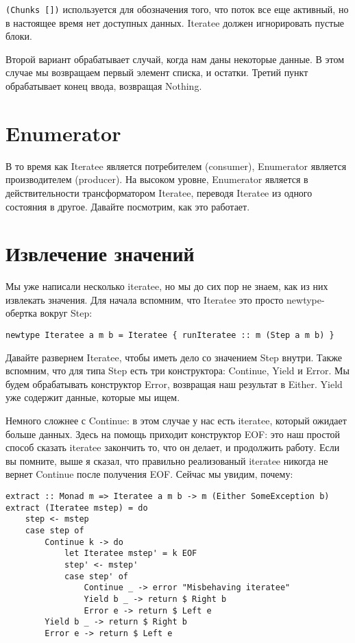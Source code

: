 \lstinline'(Chunks [])' используется для обозначения того, что поток все еще активный, но в настоящее время нет доступных данных. Iteratee должен игнорировать пустые блоки.

Второй вариант обрабатывает случай, когда нам даны некоторые данные. В этом случае мы возвращаем первый элемент списка, и остатки. Третий пункт обрабатывает конец ввода, возвращая Nothing.

\section{Enumerator}

В то время как Iteratee является потребителем (consumer), Enumerator является производителем (producer). На высоком уровне, Enumerator является в действительности трансформатором Iteratee, переводя Iteratee из одного состояния в другое. Давайте посмотрим, как это работает.

\section{Извлечение значений}

Мы уже написали несколько iteratee, но мы до сих пор не знаем, как из них извлекать значения. Для начала вспомним, что Iteratee это просто newtype-обертка вокруг Step:

\begin{lstlisting}
newtype Iteratee a m b = Iteratee { runIteratee :: m (Step a m b) }
\end{lstlisting}

Давайте развернем Iteratee, чтобы иметь дело со значением Step внутри. Также вспомним, что для типа Step есть три конструктора: Continue, Yield и Error. Мы будем обрабатывать конструктор Error, возвращая наш результат в Either. Yield уже содержит данные, которые мы ищем.

Немного сложнее с Continue: в этом случае у нас есть iteratee, который ожидает больше данных. Здесь на помощь приходит конструктор EOF: это наш простой способ сказать iteratee закончить то, что он делает, и продолжить работу. Если вы помните, выше я сказал, что правильно реализованый iteratee никогда не вернет Continue после получения EOF. Сейчас мы увидим, почему:

\begin{lstlisting}
extract :: Monad m => Iteratee a m b -> m (Either SomeException b)
extract (Iteratee mstep) = do
    step <- mstep
    case step of
        Continue k -> do
            let Iteratee mstep' = k EOF
            step' <- mstep'
            case step' of
                Continue _ -> error "Misbehaving iteratee"
                Yield b _ -> return $ Right b
                Error e -> return $ Left e
        Yield b _ -> return $ Right b
        Error e -> return $ Left e
\end{lstlisting}%

